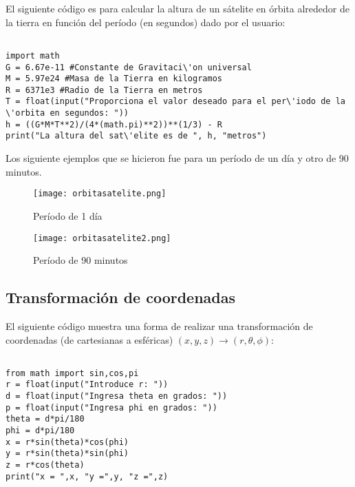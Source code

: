 \documentclass[a4 paper]{article}
\numberwithin{equation}{section}
\newcommand{\0}{\mathbf{0}}
\begin{document}
El siguiente c\'odigo es para calcular la altura de un s\'atelite en \'orbita alrededor de la tierra en funci\'on del per\'iodo (en segundos) dado por el usuario:

\begin{verbatim}

import math
G = 6.67e-11 #Constante de Gravitaci\'on universal
M = 5.97e24 #Masa de la Tierra en kilogramos
R = 6371e3 #Radio de la Tierra en metros
T = float(input("Proporciona el valor deseado para el per\'iodo de la \'orbita en segundos: "))
h = ((G*M*T**2)/(4*(math.pi)**2))**(1/3) - R
print("La altura del sat\'elite es de ", h, "metros")

\end{verbatim}

\newpage

Los siguiente ejemplos que se hicieron fue para un per\'iodo de un d\'ia y otro de 90 minutos.

\vspace{0.5cm}

\begin{figure}[!ht]
  \centering
      \texttt{[image: orbitasatelite.png]}
  \caption{Per\'iodo de 1 d\'ia}
\end{figure}

\vspace{0.5cm}

\begin{figure}[!ht]
  \centering
      \texttt{[image: orbitasatelite2.png]}
  \caption{Per\'iodo de 90 minutos}
\end{figure}

\vspace{0.5cm}

\subsection*{Transformaci\'on de coordenadas}

El siguiente c\'odigo muestra una forma de realizar una transformaci\'on de coordenadas (de cartesianas a esf\'ericas) $(x,y,z) \rightarrow (r,\theta,\phi)$:

\begin{verbatim}

from math import sin,cos,pi
r = float(input("Introduce r: "))
d = float(input("Ingresa theta en grados: "))
p = float(input("Ingresa phi en grados: "))
theta = d*pi/180
phi = d*pi/180
x = r*sin(theta)*cos(phi)
y = r*sin(theta)*sin(phi)
z = r*cos(theta)
print("x = ",x, "y =",y, "z =",z)

\end{verbatim}
\end{document}
